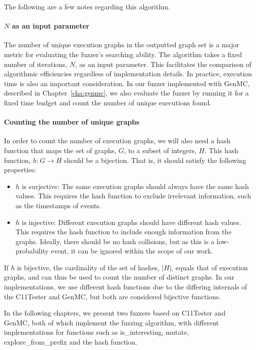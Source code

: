 The following are a few notes regarding this algorithm.

\paragraph*{$N$ as an input parameter} The number of unique execution graphs in the outputted graph set is a major metric for evaluating the fuzzer's searching ability. The algorithm takes a fixed number of iterations, $N$, as an input parameter. This facilitates the comparison of algorithmic efficiencies regardless of implementation details. In practice, execution time is also an important consideration. In our fuzzer implemented with GenMC, described in Chapter~\ref{cha:genmc}, we also evaluate the fuzzer by running it for a fixed time budget and count the number of unique executions found.

\paragraph*{Counting the number of unique graphs} In order to count the number of execution graphs, we will also need a hash function that maps the set of graphs, $G$, to a subset of integers, $H$. This hash function, $h: G \to H$ should be a bijection. That is, it should satisfy the following properties:
\begin{itemize}
    \item $h$ is surjective: The same execution graphs should always have the same hash values. This requires the hash function to exclude irrelevant information, such as the timestamps of events. 
	\item $h$ is injective: Different execution graphs should have different hash values. This requires the hash function to include enough information from the graphs. Ideally, there should be no hash collisions, but as this is a low-probability event, it can be ignored within the scope of our work.
\end{itemize}

If $h$ is bijective, the cardinality of the set of hashes, $|H|$, equals that of execution graphs, and can thus be used to count the number of distinct graphs. In our implementations, we use different hash functions due to the differing internals of the C11Tester and GenMC, but both are considered bijective functions.




In the following chapters, we present two fuzzers based on C11Tester and GenMC, both of which implement the fuzzing algorithm, with different implementations for functions such as is\_interesting, mutate,  explore\_from\_prefix and the hash function.













